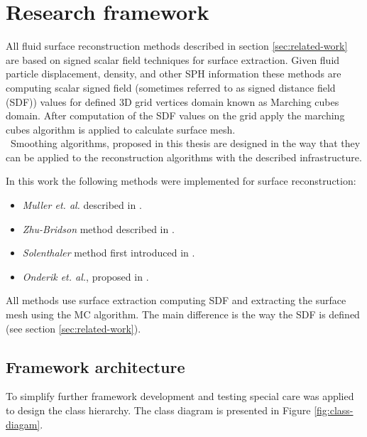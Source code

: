 \chapter{Research framework}
All fluid surface reconstruction methods described in section \ref{sec:related-work} are based on signed scalar field techniques for surface extraction. Given fluid particle displacement, density, and other SPH information these methods are computing scalar signed field (sometimes referred to as signed distance field (SDF)) values for defined 3D grid vertices domain known as Marching cubes domain. After computation of the SDF values on the grid apply the marching cubes algorithm is applied to calculate surface mesh.\\\
Smoothing algorithms, proposed in this thesis are designed in the way that they can be applied to the reconstruction algorithms with the described infrastructure.


In this work the following methods were implemented for surface reconstruction:
\begin{itemize}
  \item \emph{Muller et. al.} described in \cite{Muller}.
  \item \emph{Zhu-Bridson} method described in \cite{ZhuBridson}.
  \item \emph{Solenthaler} method first introduced in \cite{Solenthaler}.
  \item \emph{Onderik et. al.}, proposed in \cite{OnderikEtAl}.
\end{itemize}
All methods use surface extraction computing SDF and extracting the surface mesh using the MC algorithm. The main difference is the way the SDF is defined (see section \ref{sec:related-work}).



\section{Framework architecture}
To simplify further framework development and testing special care was applied to design the class hierarchy. The class diagram is presented in Figure \ref{fig:class-diagam}.


